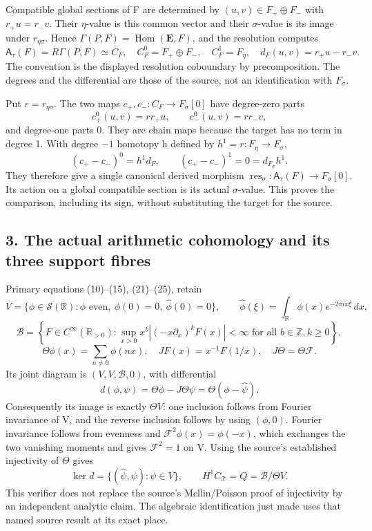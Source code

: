 \documentclass[10pt,a4paper,oneside]{report}
\begin{document}
Compatible global sections of F are determined by \((u,v)\in F_+\oplus F_-\) with \(r_+u=r_-v\). Their \(\eta\)-value is this common vector and their \(\sigma\)-value is its image under \(r_{\eta\sigma}\). Hence \(\Gamma(P,F)=\operatorname{Hom}(\mathbf E,F)\), and the resolution computes \[
\mathsf A_\tau(F)=R\Gamma(P,F)\simeq C_F,
\quad C_F^0=F_+\oplus F_-,\quad C_F^1=F_\eta,
\quad d_F(u,v)=r_+u-r_-v.
\] The convention is the displayed resolution coboundary by precomposition. The degrees and the differential are those of the source, not an identification with \(F_\sigma\).

Put \(r=r_{\eta\sigma}\). The two maps \(c_+,c_-:C_F\to F_\sigma[0]\) have degree-zero parts \[
c_+^0(u,v)=rr_+u,\qquad c_-^0(u,v)=rr_-v,
\] and degree-one parts 0. They are chain maps because the target has no term in degree 1. With degree \(-1\) homotopy h defined by \(h^1=r:F_\eta\to F_\sigma\), \[
(c_+-c_-)^0=h^1d_F,
\qquad (c_+-c_-)^1=0=d_{F_\sigma}h^1.
\] They therefore give a single canonical derived morphism \(\operatorname{res}_\sigma:\mathsf A_\tau(F)\to F_\sigma[0]\). Its action on a global compatible section is its actual \(\sigma\)-value. This proves the comparison, including its sign, without substituting the target for the source.

\subsection{3. The actual arithmetic cohomology and its three support fibres}\label{proof01:source-maps-the-actual-arithmetic-cohomology-and-its-three-support-fibres}

Primary equations (10)--(15), (21)--(25), retain \[
V=\{\phi\in\mathcal S(\mathbb R):\phi\text{ even},\ \phi(0)=0,
\ \widehat\phi(0)=0\},\qquad
\widehat\phi(\xi)=\int_{\mathbb R}\phi(x)e^{-2\pi i x\xi}\,dx,
\] \[
\mathscr B=\left\{F\in C^\infty(\mathbb R_{>0}):
\sup_{x>0}x^b|(-x\partial_x)^kF(x)|<\infty
\text{ for all }b\in\mathbb Z,k\geq0\right\},
\] \[
\Theta\phi(x)=\sum_{n\ne0}\phi(nx),\quad
JF(x)=x^{-1}F(1/x),\quad J\Theta=\Theta\mathcal F.
\] Its joint diagram is \((V,V,\mathscr B,0)\), with differential \[
d(\phi,\psi)=\Theta\phi-J\Theta\psi
=\Theta(\phi-\widehat\psi).
\] Consequently its image is exactly \(\Theta V\): one inclusion follows from Fourier invariance of V, and the reverse inclusion follows by using \((\phi,0)\). Fourier invariance follows from evenness and \(\mathcal F^2\phi(x)=\phi(-x)\), which exchanges the two vanishing moments and gives \(\mathcal F^2=1\) on V. Using the source's established injectivity of \(\Theta\) gives \[
\ker d=\{(\widehat\psi,\psi):\psi\in V\},\qquad
H^1C_{\mathcal T}=Q=\mathscr B/\Theta V.
\] This verifier does not replace the source's Mellin/Poisson proof of injectivity by an independent analytic claim. The algebraic identification just made uses that named source result at its exact place.
\end{document}

